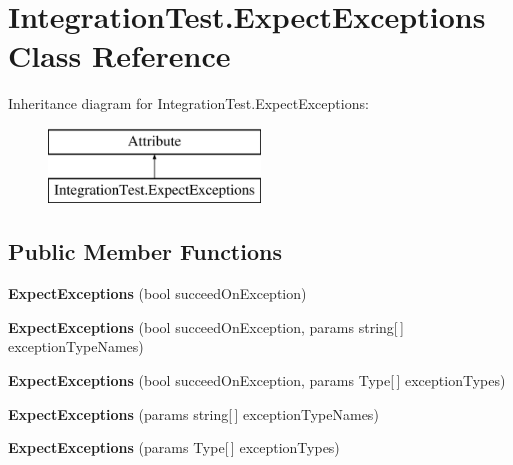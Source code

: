 \hypertarget{class_integration_test_1_1_expect_exceptions}{}\section{Integration\+Test.\+Expect\+Exceptions Class Reference}
\label{class_integration_test_1_1_expect_exceptions}
Inheritance diagram for Integration\+Test.\+Expect\+Exceptions\+:\begin{figure}[H]
\begin{center}
\leavevmode
\includegraphics[height=2.000000cm]{class_integration_test_1_1_expect_exceptions}
\end{center}
\end{figure}
\subsection*{Public Member Functions}
\begin{DoxyCompactItemize}
\item 
\mbox{\label{class_integration_test_1_1_expect_exceptions_ad1c994c26b28d2dc0d2aa2dbe270a9d4}} 
{\bfseries Expect\+Exceptions} (bool succeed\+On\+Exception)
\item 
\mbox{\label{class_integration_test_1_1_expect_exceptions_ae582e6c0e11a50492dde18cc196adc6d}} 
{\bfseries Expect\+Exceptions} (bool succeed\+On\+Exception, params string\mbox{[}$\,$\mbox{]} exception\+Type\+Names)
\item 
\mbox{\label{class_integration_test_1_1_expect_exceptions_a1d4a9c88ec9d97a92e144fdbc131d2bb}} 
{\bfseries Expect\+Exceptions} (bool succeed\+On\+Exception, params Type\mbox{[}$\,$\mbox{]} exception\+Types)
\item 
\mbox{\label{class_integration_test_1_1_expect_exceptions_ab3bb4935fc6e6ef37265bcb7157d2352}} 
{\bfseries Expect\+Exceptions} (params string\mbox{[}$\,$\mbox{]} exception\+Type\+Names)
\item 
\mbox{\label{class_integration_test_1_1_expect_exceptions_af1e9da6d4b49cea72744048281e84366}} 
{\bfseries Expect\+Exceptions} (params Type\mbox{[}$\,$\mbox{]} exception\+Types)
\end{DoxyCompactItemize}
